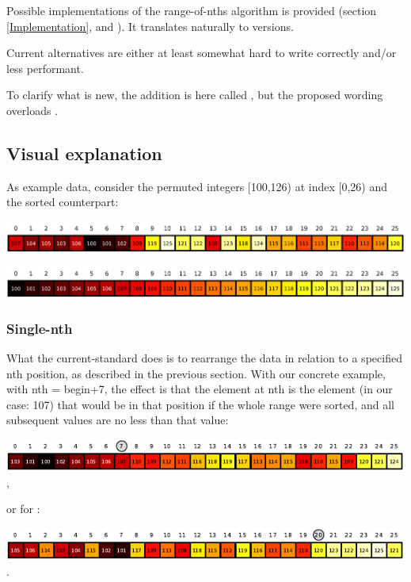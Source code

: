 Possible implementations of the range-of-nths algorithm is provided (section \ref{Implementation}, and \cite{p2375RefImpl}).
It translates naturally to  versions.

Current alternatives are either at least somewhat hard to write correctly and/or less performant.

To clarify what is new, the addition is here called , but the proposed wording overloads . 

\newpage
\subsection{Visual explanation}

As example data, consider the permuted integers [100,126) at index [0,26) and the sorted counterpart:

\includegraphics[width=0.999\textwidth]{plotting/figs/rnd.png}

\includegraphics[width=0.999\textwidth]{plotting/figs/sort.png}

\subsubsection*{Single-nth }

What the current-standard  does is to rearrange the data in relation to a specified nth position, as described in the previous section. With our concrete example, with {nth = begin+7}, the effect is that the element at nth is the element (in our case: 107) that  would  be  in  that position if the whole range were sorted, and all subsequent values are no less than that value:

\includegraphics[width=0.999\textwidth]{plotting/figs/1a.pdf},

or for :

\includegraphics[width=0.999\textwidth]{plotting/figs/1b.pdf}.

